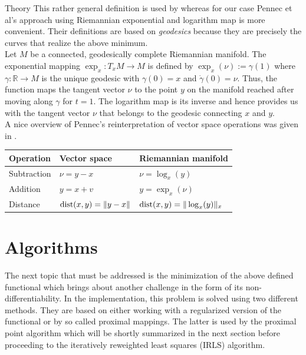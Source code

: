 \begin{chapter}{Theory}
This rather general definition is used by \cite{Absil2009} whereas for our
case Pennec et al's \cite{Arsigny} approach using Riemannian exponential and logarithm map is more convenient. Their definitions are based on
\emph{geodesics} because they are precisely the curves that realize the above minimum.\\

Let $M$ be a connected, geodesically complete Riemannian manifold. The exponential mapping $\exp_x:T_xM\to M$ is defined by $\exp_x(\nu):=\gamma(1)$
where $\gamma:\mathbb{R}\to M$ is the unique geodesic with $\gamma(0)=x$ and $\dot{\gamma}(0)=\nu$.
Thus, the function maps the tangent vector $\nu$ to the point $y$ on the manifold reached after moving along $\gamma$ for $t=1$.
The logarithm map is its inverse and hence provides us with the tangent vector $\nu$ that belongs to the geodesic connecting $x$ and $y$. \\

A nice overview of Pennec's reinterpretation of vector space operations was given in \cite{mara}.

\begin{table}[h!]
\centering
\begin{tabular}{|l|l|l|}
\hline
Operation   & Vector space &	Riemannian manifold \\
\hline
Subtraction & $\nu=y-x$	& $\nu=\log_x(y)$	\\
Addition    & $y=x+v$	& $y=\exp_x(\nu)$	\\
Distance    & $\operatorname{dist}(x,y)=\| y-x \|$	& $ \operatorname{dist}(x,y)=\| \log_x(y) \|_x$ \\
\hline
\end{tabular}
\end{table}

\section{Algorithms} %
\label{sec:Algorithms}
The next topic that must be addressed is the minimization of the above defined functional which brings about another challenge in the form of its non-differentiability.
In the implementation, this problem is solved using two different methods. They are based on either working with a regularized version of the functional or by so called
proximal mappings. The latter is used by the proximal point algorithm which will be shortly summarized in the next section before proceeding to
the iteratively reweighted least squares (IRLS) algorithm.



\end{chapter}
